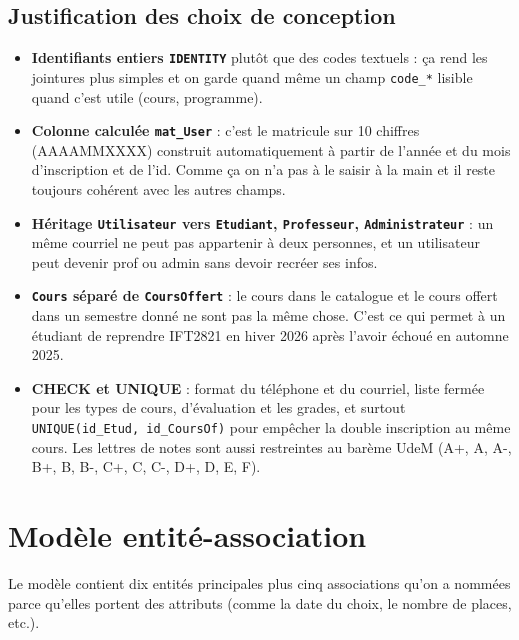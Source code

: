 \documentclass[11pt,a4paper]{article}
\begin{document}
\subsection{Justification des choix de conception}

\begin{itemize}
    \item \textbf{Identifiants entiers \texttt{IDENTITY}} plutôt que
        des codes textuels : ça rend les jointures plus simples et on
        garde quand même un champ \texttt{code\_*} lisible quand c'est
        utile (cours, programme).
    \item \textbf{Colonne calculée \texttt{mat\_User}} : c'est le
        matricule sur 10 chiffres (AAAAMMXXXX) construit automatiquement
        à partir de l'année et du mois d'inscription et de l'id. Comme
        ça on n'a pas à le saisir à la main et il reste toujours
        cohérent avec les autres champs.
    \item \textbf{Héritage \texttt{Utilisateur} vers \texttt{Etudiant},
        \texttt{Professeur}, \texttt{Administrateur}} : un même courriel
        ne peut pas appartenir à deux personnes, et un utilisateur peut
        devenir prof ou admin sans devoir recréer ses infos.
    \item \textbf{\texttt{Cours} séparé de \texttt{CoursOffert}} : le
        cours dans le catalogue et le cours offert dans un semestre
        donné ne sont pas la même chose. C'est ce qui permet à un
        étudiant de reprendre IFT2821 en hiver 2026 après l'avoir
        échoué en automne 2025.
    \item \textbf{CHECK et UNIQUE} : format du téléphone et du courriel,
        liste fermée pour les types de cours, d'évaluation et les
        grades, et surtout \texttt{UNIQUE(id\_Etud, id\_CoursOf)} pour
        empêcher la double inscription au même cours. Les lettres de
        notes sont aussi restreintes au barème UdeM
        (A+, A, A-, B+, B, B-, C+, C, C-, D+, D, E, F).
\end{itemize}


\section{Modèle entité-association}

Le modèle contient dix entités principales plus cinq associations qu'on
a nommées parce qu'elles portent des attributs (comme la date du choix,
le nombre de places, etc.).
\end{document}
